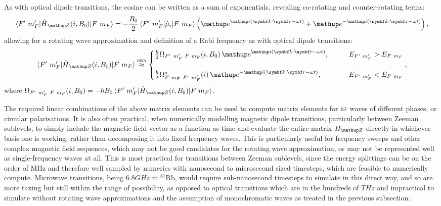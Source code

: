 As with optical dipole transitions, the cosine can be written as a sum of exponentials, revealing co-rotating and counter-rotating terms:
\begin{align}
\matrixel{F^\prime\ m_F^\prime}{\hat H_\up{Z}(i, B_0)}{F\ m_F}
=
-\frac{B_0}2\matrixel{F^\prime\ m_F^\prime}{\hat{\mu}_i}{F\ m_F}
\left(\ee^{\ii(\vec k\cdot \vec r - \omega t)}
+ \ee^{-\ii(\vec k\cdot \vec r - \omega t)}\right),
\end{align}
allowing for a rotating wave approximation and definition of a Rabi frequency as with optical dipole transitions:
\begin{align}\label{eq:magnetic_rwa_with_rabifreq}
\matrixel{F^\prime\ m_F^\prime}{\hat H_\up{Z}(i, B_0)}{F\ m_F} \overset{\textsc{rwa}}\approx
\begin{cases}
\frac\hbar2\Omega_{F^\prime\ m_F^\prime\ F\ m_F}(i, B_0)\,
\ee^{\ii(\vec k \cdot \vec r - \omega t)},\qquad
& E_{F^\prime\ m_F^\prime} > E_{F\ m_F}\\
\\
\frac\hbar2\Omega^*_{F\ m_F\ F^\prime\ m_F^\prime}(i)\,
\ee^{-\ii(\vec k \cdot \vec r - \omega t)},\qquad
& E_{F^\prime\ m_F^\prime} < E_{F\ m_F}
\end{cases},
\end{align}
where $\Omega_{F^\prime\ m_F^\prime\ F\ m_F}(i, B_0) = -\hbar B_0 \matrixel{F^\prime\ m_F^\prime}{\hat H_\up{Z}(i, B_0)}{F\ m_F}$.

The required linear combinations of the above matrix elements can be used to compute matrix elements for \textsc{rf} waves of different phases, or circular polarisations. It is also often practical, when numerically modelling magnetic dipole transitions, particularly between Zeeman sublevels, to simply include the magnetic field vector as a function as time and evaluate the entire matrix $H_\up{Z}$ directly in whichever basis one is working, rather than decomposing it into fixed frequency waves. This is particularly useful for frequency sweeps and other complex magnetic field sequences, which may not be good candidates for the rotating wave approximation, or may not be represented well as single-frequency waves at all. This is most practical for transitions between Zeeman sublevels, since the energy splittings can be on the order of MHz and therefore well sampled by numerics with nanosecond to microsecond sized timesteps, which are feasible to numerically compute. Microwave transitions, being $6.8 \unit{GHz}$ in $^{87}$Rb, would require sub-nanosecond timesteps to simulate in this direct way, and so are more taxing but still within the range of possibility, as opposed to optical transitions which are in the hundreds of $\unit{THz}$ and impractical to simulate without rotating wave approximations and the assumption of monochromatic waves as treated in the previous subsection.

